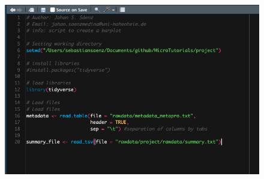 \documentclass[
  letterpaper,
  DIV=11,
  numbers=noendperiod]{scrartcl}
\begin{document}
\begin{figure}[h]

{\centering \includegraphics{script.png}

}

\end{figure}
\end{document}
